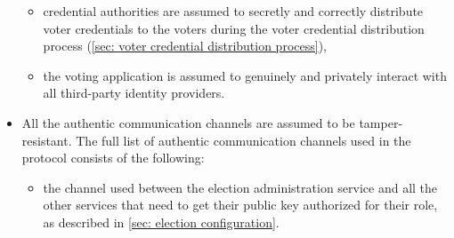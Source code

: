 \begin{itemize}
\begin{itemize}
        \item credential authorities are assumed to secretly and correctly distribute voter credentials to the voters during the voter credential distribution process (\cref{sec: voter credential distribution process}),
        \item the voting application is assumed to genuinely and privately interact with all third-party identity providers.
    \end{itemize}
    \item All the authentic communication channels are assumed to be tamper-resistant. The full list of authentic communication channels used in the protocol consists of the following:
    \begin{itemize}
        \item the channel used between the election administration service and all the other services that need to get their public key authorized for their role, as described in \cref{sec: election configuration}. 
    \end{itemize}
\end{itemize}

